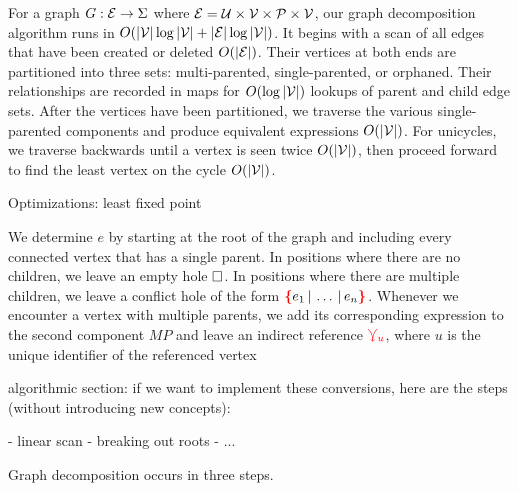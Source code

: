 

For a graph $G : \mathcal{E} \to \Sigma$ where $\mathcal{E} = \mathcal{U} \times \mathcal{V} \times \mathcal{P} \times \mathcal{V}$, our graph decomposition algorithm runs in $O(\left\lvert\mathcal{V}\right\rvert \log \left\lvert\mathcal{V}\right\rvert + \left\lvert\mathcal{E}\right\rvert \log \left\lvert\mathcal{V}\right\rvert)$.
It begins with a scan of all edges that have been created or deleted $O(\left\lvert\mathcal{E}\right\rvert)$.
Their vertices at both ends are partitioned into three sets: multi-parented, single-parented, or orphaned.
Their relationships are recorded in maps for $O(\log \left\lvert\mathcal{V}\right\rvert)$ lookups of parent and child edge sets.
After the vertices have been partitioned, we traverse the various single-parented components and produce equivalent expressions $O(\left\lvert\mathcal{V}\right\rvert)$.
For unicycles, we traverse backwards until a vertex is seen twice $O(\left\lvert\mathcal{V}\right\rvert)$, then proceed forward to find the least vertex on the cycle $O(\left\lvert\mathcal{V}\right\rvert)$.


Optimizations: least fixed point


We determine $e$ by starting at the root of the graph and including every connected
vertex that has a single parent. In positions where there are no children, we
leave an empty hole $\square$. In positions where there are multiple children, we
leave a conflict hole of the form $\conflictHole{e_1,\ldots,e_n}$. Whenever we
encounter a vertex with multiple parents, we add its corresponding expression to
the second component $MP$ and leave an indirect reference $\textcolor{red}{\curlyveedownarrow_{u}}$, where $u$ is
the unique identifier of the referenced vertex


algorithmic section: if we want to implement these conversions, here are the
steps (without introducing new concepts):

- linear scan
- breaking out roots
- ...

Graph decomposition occurs in three steps.



